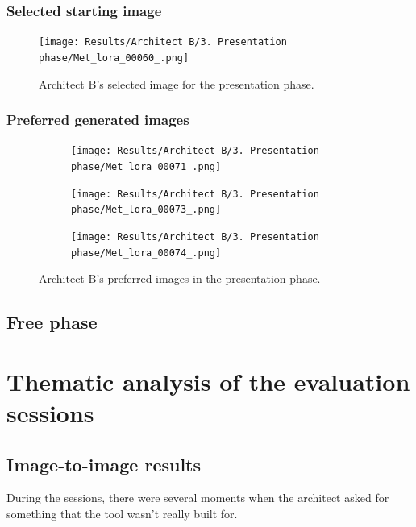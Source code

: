 \subsubsection{Selected starting image}
\begin{figure}[H]
    \centering
    \texttt{[image: Results/Architect B/3. Presentation phase/Met\_lora\_00060\_.png]}
    \caption{Architect B's selected image for the presentation phase.}
    \label{fig:placeholder}
\end{figure}
\subsubsection{Preferred generated images}
\begin{figure}[H]
    \centering
    \begin{subfigure}[b]{0.3\textwidth}
        \centering
        \texttt{[image: Results/Architect B/3. Presentation phase/Met\_lora\_00071\_.png]}
        \caption{}
        \label{fig:B-presentation-preferred-a}
    \end{subfigure}
    \hfill
    \begin{subfigure}[b]{0.3\textwidth}
        \centering
        \texttt{[image: Results/Architect B/3. Presentation phase/Met\_lora\_00073\_.png]}
        \caption{}
        \label{fig:B-presentation-preferred-b}
    \end{subfigure}
    \hfill
    \begin{subfigure}[b]{0.3\textwidth}
        \centering
        \texttt{[image: Results/Architect B/3. Presentation phase/Met\_lora\_00074\_.png]}
        \caption{}
        \label{fig:B-presentation-preferred-c}
    \end{subfigure}
    \caption{Architect B's preferred images in the presentation phase.}
    \label{fig:B-presentation-preferred}
\end{figure}
\subsection{Free phase}

\section{Thematic analysis of the evaluation sessions}
\subsection{Image-to-image results}
During the sessions, there were several moments when the architect asked for something that the tool wasn't really built for.
